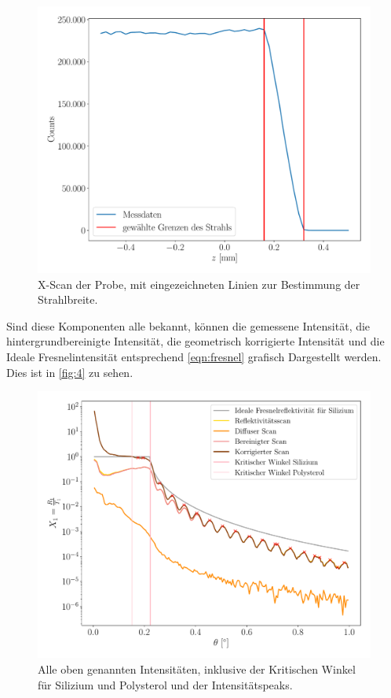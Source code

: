 \documentclass[12pt]{article}
\begin{document}
\begin{figure}[H]
  \centering
  \includegraphics[scale=0.5]{Ressourcen/zscan.pdf}
  \caption{X-Scan der Probe, mit eingezeichneten Linien zur Bestimmung der Strahlbreite.}\label{fig:z}
\end{figure}
Sind diese Komponenten alle bekannt, können die gemessene Intensität, die hintergrundbereinigte Intensität, die geometrisch korrigierte Intensität und die Ideale Fresnelintensität entsprechend \autoref{eqn:fresnel} grafisch Dargestellt werden.
Dies ist in \autoref{fig:4} zu sehen.
\begin{figure}[H]
  \centering
  \includegraphics[scale=0.6]{Ressourcen/probe.pdf}
  \caption{Alle oben genannten Intensitäten, inklusive der Kritischen Winkel für Silizium und Polysterol und der Intensitätspeaks.}\label{fig:7}
\end{figure}
\end{document}
